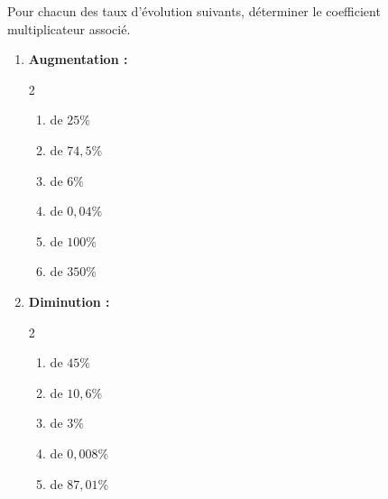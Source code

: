 \begin{exo}{}
	Pour chacun des taux d'évolution suivants, déterminer le coefficient multiplicateur associé.
	\begin{enumerate}
		\item \textbf{Augmentation :}
		      \vspace*{-2mm}\begin{multicols}{2}\begin{enumerate}
			      \item de $25\%$
			      \item de $74,5$\%
			      \item de $6\%$
			      \item de $0,04$\%
			      \item de $100\%$
			      \item de $350\%$
		      \end{enumerate}\end{multicols}\vspace*{-2mm}
		\item \textbf{Diminution :}
		      \vspace*{-2mm}\begin{multicols}{2}\begin{enumerate}
			      \item de $45\%$
			      \item de $10,6$\%
			      \item de $3\%$
			      \item de $0,008$\%
			      \item de $87,01$\%
		      \end{enumerate}\end{multicols}\vspace*{-2mm}
	\end{enumerate}
\end{exo}
